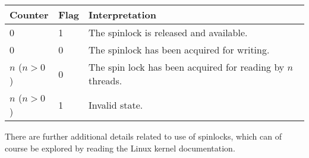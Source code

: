 \begin{center}
\begin{tabular}{l|l|l}
	\textbf{Counter} & \textbf{Flag} & \textbf{Interpretation}\\\hline
	0 & 1 & The spinlock is released and available. \\
	0 & 0 & The spinlock has been acquired for writing.\\
	$n$ ($n > 0$) & 0 & The spin lock has been acquired for reading by $n$ threads.\\
	$n$ ($n > 0$) & 1 & Invalid state.\\
\end{tabular}
\end{center}

There are further additional details related to use of spinlocks, which can of course be explored by reading the Linux kernel documentation.




